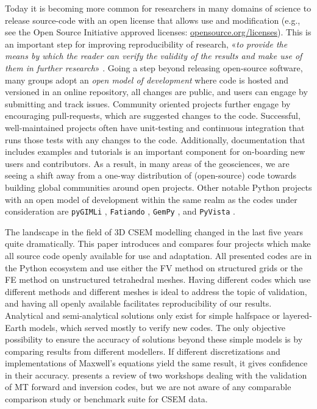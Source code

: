 \documentclass[extra, camera,%
]{gji}
\begin{document}
Today it is becoming more common for researchers in many domains of science to release source-code with an open license that allows use and modification (e.g., see the Open Source Initiative approved licenses: \href{https://opensource.org/licenses}{opensource.org/licenses}). This is an important step for improving reproducibility of research, «\emph{to provide the means by which the reader can verify the validity of the results and make use of them in further research}» \citep{GEO.17.Broggini}. Going a step beyond releasing open-source software, many groups adopt an \emph{open model of development} where code is hosted and versioned in an online repository, all changes are public, and users can engage by submitting and track issues. Community oriented projects further engage by encouraging pull-requests, which are suggested changes to the code. Successful, well-maintained projects often have unit-testing and continuous integration that runs those tests with any changes to the code. Additionally, documentation that includes examples and tutorials is an important component for on-boarding new users and contributors. As a result, in many areas of the geosciences, we are seeing a shift away from a one-way distribution of (open-source) code towards building global communities around open projects. Other notable Python projects with an open model of development within the same realm as the codes under consideration are \texttt{pyGIMLi} \citep{CAG.17.Rucker}, \texttt{Fatiando} \citep{JOSS.18.Uieda}, \texttt{GemPy} \citep{GMD.19.DeLaVarga}, and \texttt{PyVista} \citep{JOSS.19.Sullivan}.

The landscape in the field of 3D CSEM modelling changed in the last five years quite dramatically. This paper introduces and compares four projects which make all source code openly available for use and adaptation. All presented codes are in the Python ecosystem and use either the FV method on structured grids or the FE method on unstructured tetrahedral meshes. Having different codes which use different methods and different meshes is ideal to address the topic of validation, and having all openly available facilitates reproducibility of our results. Analytical and semi-analytical solutions only exist for simple halfspace or layered-Earth models, which served mostly to verify new codes. The only objective possibility to ensure the accuracy of solutions beyond these simple models is by comparing results from different modellers. If different discretizations and implementations of Maxwell's equations yield the same result, it gives confidence in their accuracy. \cite{GJI.13.Miensopust} presents a review of two workshops dealing with the validation of MT forward and inversion codes, but we are not aware of any comparable comparison study or benchmark suite for CSEM data.
\end{document}
